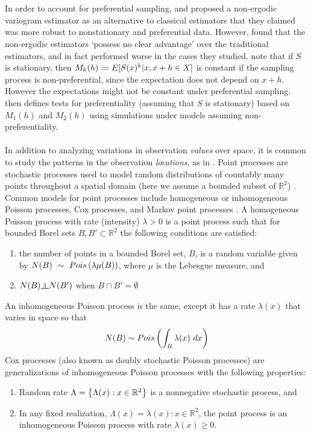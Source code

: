 \documentclass{uwstat572}
\begin{document}
\\\\
In order to account for preferential sampling, \citet{isaaks1988} and \citet{srivastava1989} proposed a non-ergodic variogram estimator as an alternative to classical estimators that they claimed was more robust to nonstationary and preferential data.  However, \citet{curriero2002} found that the non-ergodic estimators `possess no clear advantage' over the traditional estimators, and in fact performed worse in the cases they studied.  \citet{schlather2004} note that if $S$ is stationary, then $M_k(h) \coloneqq E[S(x)^k \vert x, x+h \in X]$ is constant if the sampling process is non-preferential, since the expectation does not depend on $x+h$.  However the expectations might not be constant under preferential sampling.  \citet{schlather2004} then defines tests for preferentiality (assuming that $S$ is stationary) based on $M_1(h)$ and $M_2(h)$ using simulations under models assuming non-preferentiality.
\\\\
In addition to analyzing variations in observation \emph{values} over space, it is common to study the patterns in the observation \emph{locations}, as in \citet{diggle2010}.  Point processes are stochastic processes used to model random distributions of countably many points throughout a spatial domain (here we assume a bounded subset of $\mathbb{R}^2$) \citep{handbook}.  Common models for point processes include homogeneous or inhomogeneous Poisson processes, Cox processes, and Markov point processes \citep{handbook}.  A homogeneous Poisson process with rate (intensity) $\lambda > 0$ is a point process such that for bounded Borel sets $B, B' \subset \mathbb{R}^2$ the following conditions are satisfied:
\begin{enumerate}
\item the number of points in a bounded Borel set, $B$, is a random variable given by $N(B)~\sim~Pois \left( \lambda \mu(B) \right) $, where $\mu$ is the Lebesgue measure, and
\item $N(B) \indep N(B')$ when $B \cap B' = \emptyset$
\end{enumerate}
An inhomogeneous Poisson process is the same, except it has a rate $\lambda(x)$ that varies in space so that 
$$ N(B) \sim Pois \left( \int_B \lambda(x) \ dx \right) $$
Cox processes \citep{cox1955} (also known as doubly stochastic Poisson processes) are generalizations of inhomogeneous Poisson processes with the following properties:
\begin{enumerate}
\item Random rate $\Lambda = \left\{\Lambda(x) : x \in \mathbb{R}^2\right\}$ is a nonnegative stochastic process, and
\item In any fixed realization, $\Lambda(x) = \lambda(x) : x \in \mathbb{R}^2$, the point process is an inhomogeneous Poisson process with rate $\lambda(x) \geq 0$.
\end{enumerate}
\end{document}
